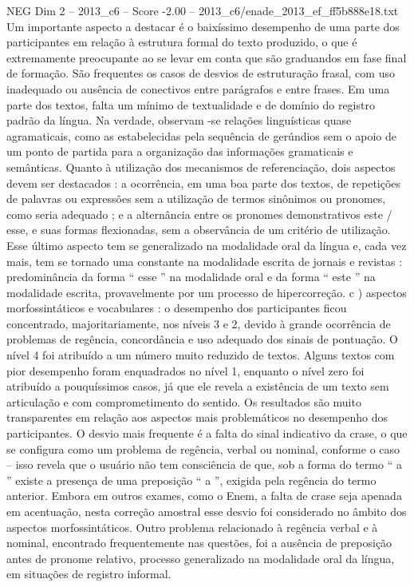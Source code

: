 \begin{textsample}{NEG Dim 2 – 2013\_c6 – Score -2.00 – 2013\_c6/enade\_2013\_ef\_ff5b888e18.txt}
Um importante aspecto a destacar é o baixíssimo desempenho de uma parte dos participantes em relação à estrutura formal do texto produzido, o que é extremamente preocupante ao se levar em conta que são graduandos em fase final de formação.
São frequentes os casos de desvios de estruturação frasal, com uso inadequado ou ausência de conectivos entre parágrafos e entre frases.
Em uma parte dos textos, falta um mínimo de textualidade e de domínio do registro padrão da língua.
Na verdade, observam -se relações linguísticas quase agramaticais, como as estabelecidas pela sequência de gerúndios sem o apoio de um ponto de partida para a organização das informações gramaticais e semânticas.
Quanto à utilização dos mecanismos de referenciação, dois aspectos devem ser destacados : a ocorrência, em uma boa parte dos textos, de repetições de palavras ou expressões sem a utilização de termos sinônimos ou pronomes, como seria adequado ; e a alternância entre os pronomes demonstrativos este / esse, e suas formas flexionadas, sem a observância de um critério de utilização.
Esse último aspecto tem se generalizado na modalidade oral da língua e, cada vez mais, tem se tornado uma constante na modalidade escrita de jornais e revistas : predominância da forma “ esse ” na modalidade oral e da forma “ este ” na modalidade escrita, provavelmente por um processo de hipercorreção. c ) aspectos morfossintáticos e vocabulares : o desempenho dos participantes ficou concentrado, majoritariamente, nos níveis 3 e 2, devido à grande ocorrência de problemas de regência, concordância e uso adequado dos sinais de pontuação.
O nível 4 foi atribuído a um número muito reduzido de textos.
Alguns textos com pior desempenho foram enquadrados no nível 1, enquanto o nível zero foi atribuído a pouquíssimos casos, já que ele revela a existência de um texto sem articulação e com comprometimento do sentido.
Os resultados são muito transparentes em relação aos aspectos mais problemáticos no desempenho dos participantes.
O desvio mais frequente é a falta do sinal indicativo da crase, o que se configura como um problema de regência, verbal ou nominal, conforme o caso – isso revela que o usuário não tem consciência de que, sob a forma do termo “ a ” existe a presença de uma preposição “ a ”, exigida pela regência do termo anterior.
Embora em outros exames, como o Enem, a falta de crase seja apenada em acentuação, nesta correção amostral esse desvio foi considerado no âmbito dos aspectos morfossintáticos.
Outro problema relacionado à regência verbal e à nominal, encontrado frequentemente nas questões, foi a ausência de preposição antes de pronome relativo, processo generalizado na modalidade oral da língua, em situações de registro informal.

\end{textsample}
